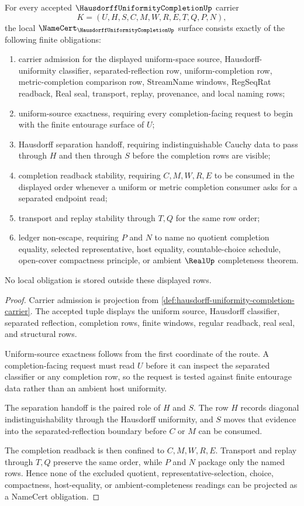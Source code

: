 \begin{theorem}
\label{thm:hausdorff-uniformity-completion-namecert-obligations}
For every accepted $\HausdorffUniformityCompletionUp$ carrier
$$
K=(U,H,S,C,M,W,R,E,T,Q,P,N),
$$
the local $\NameCert_{\HausdorffUniformityCompletionUp}$ surface consists exactly of the following finite obligations:
\begin{enumerate}
\item carrier admission for the displayed uniform-space source, Hausdorff-uniformity classifier, separated-reflection row, uniform-completion row, metric-completion comparison row, StreamName windows, RegSeqRat readback, Real seal, transport, replay, provenance, and local naming rows;
\item uniform-source exactness, requiring every completion-facing request to begin with the finite entourage surface of $U$;
\item Hausdorff separation handoff, requiring indistinguishable Cauchy data to pass through $H$ and then through $S$ before the completion rows are visible;
\item completion readback stability, requiring $C,M,W,R,E$ to be consumed in the displayed order whenever a uniform or metric completion consumer asks for a separated endpoint read;
\item transport and replay stability through $T,Q$ for the same row order;
\item ledger non-escape, requiring $P$ and $N$ to name no quotient completion equality, selected representative, host equality, countable-choice schedule, open-cover compactness principle, or ambient $\RealUp$ completeness theorem.
\end{enumerate}
No local obligation is stored outside these displayed rows.
\end{theorem}
\begin{proof}
Carrier admission is projection from \autoref{def:hausdorff-uniformity-completion-carrier}. The accepted tuple displays the uniform source, Hausdorff classifier, separated reflection, completion rows, finite windows, regular readback, real seal, and structural rows.

Uniform-source exactness follows from the first coordinate of the route. A completion-facing request must read $U$ before it can inspect the separated classifier or any completion row, so the request is tested against finite entourage data rather than an ambient host uniformity.

The separation handoff is the paired role of $H$ and $S$. The row $H$ records diagonal indistinguishability through the Hausdorff uniformity, and $S$ moves that evidence into the separated-reflection boundary before $C$ or $M$ can be consumed.

The completion readback is then confined to $C,M,W,R,E$. Transport and replay through $T,Q$ preserve the same order, while $P$ and $N$ package only the named rows. Hence none of the excluded quotient, representative-selection, choice, compactness, host-equality, or ambient-completeness readings can be projected as a NameCert obligation.
\end{proof}

